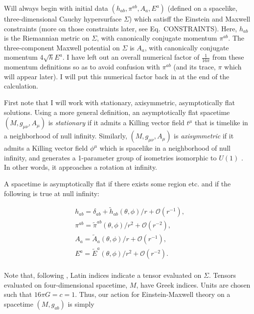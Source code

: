 \documentclass[titlepage]{article}
\def\beq{\begin{equation}}
\def\eeq{\end{equation}}
\begin{document}

Will always begin with initial data $(h_{ab},\pi^{ab},A_a,E^a)$ (defined on a spacelike, three-dimensional Cauchy hypersurface $\Sigma$) which satisff the Einstein and Maxwell constraints (more on those constraints later, see Eq.\ CONSTRAINTS).  Here, $h_{ab}$ is the Riemannian metric on $\Sigma$, with canonically conjugate momentum $\pi^{ab}$.  The three-component Maxwell potential on $\Sigma$ is $A_a$, with canonically conjugate momentum $4 \sqrt{h} E^a$.  I have left out an overall numerical factor of $\frac{1}{16\pi}$ from these momentum definitions so as to avoid confusion with $\pi^{ab}$ (and its trace, $\pi$ which will appear later).  I will put this numerical factor back in at the end of the calculation.

First note that I will work with stationary, axisymmetric, asymptotically flat solutions.  Using a more general definition, an asymptotically flat spacetime $(M,g_{\mu\nu},A_\mu)$ is \emph{stationary} if it admits a Killing vector field $t^\mu$ that is timelike in a neighborhood of null infinity.  Similarly, $(M,g_{\mu\nu},A_\mu)$ is \emph{axisymmetric} if it admits a Killing vector field $\phi^\mu$ which is spacelike in a neighborhood of null infinity, and generates a 1-parameter group of isometries isomorphic to $U(1)$ \cite{ReallNotes}.  In other words, it approaches a rotation at infinity.  

A spacetime is asymptotically flat if there exists some region etc. and if the following is true at null infinity:

\beq
\begin{aligned}
&h_{ab}= \delta_{ab} + \tilde{h}_{ab}(\theta,\phi)/r+\mathcal{O}(r^{-1}), \\
&\pi^{ab}= \tilde{\pi}^{ab}(\theta,\phi)/r^2+\mathcal{O}(r^{-2}), \\
&A_{a} = \tilde{A}_{a}(\theta,\phi)/r+\mathcal{O}(r^{-1}), \\
&E^{a}= \tilde{E}^{a}(\theta,\phi)/r^2+\mathcal{O}(r^{-2}). \\
\end{aligned}
\eeq


Note that, following \cite{sudarskyExtrema92}, Latin indices indicate a tensor evaluated on $\Sigma$.  Tensors evaluated on four-dimensional spacetime, $M$, have Greek indices. Units are chosen such that $16\pi G=c=1$.  Thus, our action for Einstein-Maxwell theory on a spacetime $(M,g_{ab})$ is simply
\end{document}
